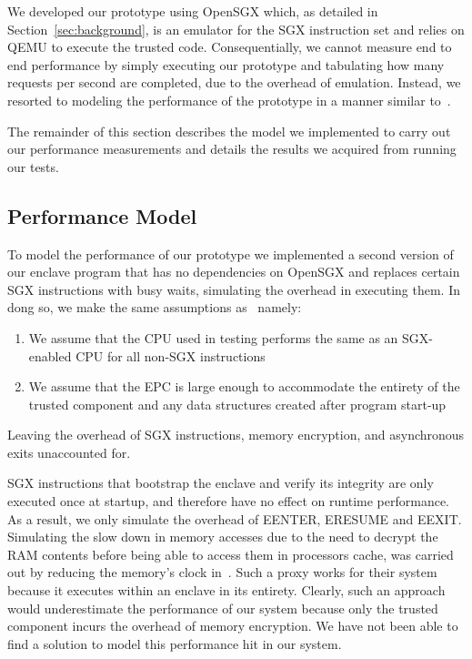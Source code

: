 \documentclass[../main.tex]{subfiles}
\begin{document}
We developed our prototype using OpenSGX which, as detailed in 
Section~\ref{sec:background}, is an emulator for the SGX instruction set and
relies on QEMU to execute the trusted code. Consequentially, we cannot measure
end to end performance by simply executing our prototype and tabulating how
many requests per second are completed, due to the overhead of emulation.
Instead, we resorted to modeling the performance of the prototype in a manner
similar to~\cite{Baumann14}.

The remainder of this section describes the model we implemented to carry out
our performance measurements and details the results we acquired from running
our tests.

\subsection{Performance Model}

To model the performance of our prototype we implemented a second version of
our enclave program that has no dependencies on OpenSGX and replaces certain
SGX instructions with busy waits, simulating the overhead in executing them.
In dong so, we make the same assumptions as~\cite{Baumann14} namely:
\begin{enumerate}
  \item We assume that the CPU used in testing performs the same as an
    SGX-enabled CPU for all non-SGX instructions
  \item We assume that the EPC is large enough to accommodate the
    entirety of the trusted component and any data structures created
    after program start-up
\end{enumerate}
Leaving the overhead of SGX instructions, memory encryption, and asynchronous
exits unaccounted for.

SGX instructions that bootstrap the enclave and verify its integrity are only
executed once at startup, and therefore have no effect on runtime performance.
As a result, we only simulate the overhead of EENTER, ERESUME and EEXIT.
Simulating the slow down in memory accesses due to the need to decrypt the RAM
contents before being able to access them in processors cache, was carried out
by reducing the memory's clock in~\cite{Baumann14}. Such a proxy works for
their system because it executes within an enclave in its entirety. Clearly,
such an approach would underestimate the performance of our system because
only the trusted component incurs the overhead of memory encryption. We have
not been able to find a solution to model this performance hit in our system.
\end{document}
